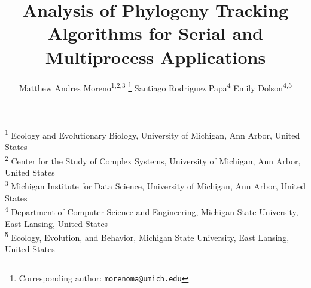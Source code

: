 \title{ Analysis of Phylogeny Tracking Algorithms for Serial and Multiprocess Applications }
\author{
    Matthew Andres Moreno\textsuperscript{1,2,3} \thanks{Corresponding author: \texttt{morenoma@umich.edu}} \quad
    Santiago Rodriguez Papa\textsuperscript{4} \quad
    Emily Dolson\textsuperscript{4,5} \quad
}
\date{}

\newcommand{\affil}[1]{\textsuperscript{#1}}
\newcommand{\affiliations}{
\affil{1} Ecology and Evolutionary Biology, University of Michigan, Ann Arbor, United States \\
\affil{2} Center for the Study of Complex Systems, University of Michigan, Ann Arbor, United States \\
\affil{3} Michigan Institute for Data Science, University of Michigan, Ann Arbor, United States \\
\affil{4} Department of Computer Science and Engineering, Michigan State University, East Lansing, United States \\
\affil{5} Ecology, Evolution, and Behavior, Michigan State University, East Lansing, United States \\
}

\maketitle

\begin{center}
\affiliations
\end{center}


